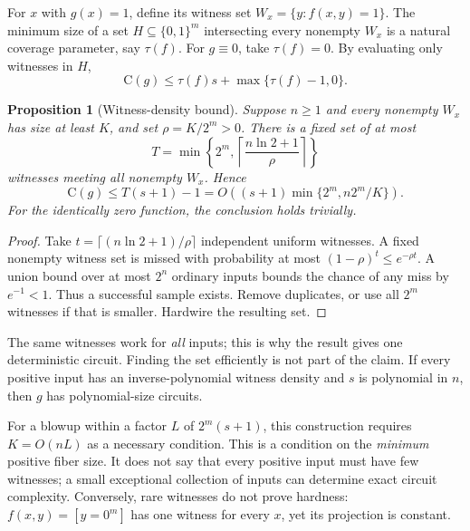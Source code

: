 \documentclass[11pt]{article}
\newtheorem{proposition}[theorem]{Proposition}
\theoremstyle{definition}
\theoremstyle{remark}
\newcommand{\B}{\{0,1\}}
\newcommand{\C}{\mathrm{C}}
\begin{document}
For $x$ with $g(x)=1$, define its witness set
$W_x=\{y:f(x,y)=1\}$. The minimum size of a set
$H\subseteq\B^m$ intersecting every nonempty $W_x$ is a natural
coverage parameter, say $\tau(f)$. For $g\equiv0$, take $\tau(f)=0$.
By evaluating only witnesses in $H$,
\begin{equation}\label{eq:cover}
 \C(g)\le\tau(f)s+\max\{\tau(f)-1,0\}.
\end{equation}

\begin{proposition}[Witness-density bound]\label{prop:density}
Suppose $n\ge1$ and every nonempty $W_x$ has size at least $K$, and set
$\rho=K/2^m>0$. There is a fixed set of at most
\begin{equation}\label{eq:hitting-size}
 T=\min\left\{2^m,
       \left\lceil\frac{n\ln2+1}{\rho}\right\rceil\right\}
\end{equation}
witnesses meeting all nonempty $W_x$. Hence
\begin{equation}\label{eq:density}
 \C(g)\le T(s+1)-1
       =O\!\left((s+1)\min\{2^m,n2^m/K\}\right).
\end{equation}
For the identically zero function, the conclusion holds trivially.
\end{proposition}
\begin{proof}
Take $t=\lceil(n\ln2+1)/\rho\rceil$ independent uniform witnesses.
A fixed nonempty witness set is missed with probability at most
$(1-\rho)^t\le e^{-\rho t}$. A union bound over at most $2^n$
ordinary inputs bounds the chance of any miss by $e^{-1}<1$.
Thus a successful sample exists. Remove duplicates, or use all $2^m$
witnesses if that is smaller. Hardwire the resulting set.
\end{proof}

The same witnesses work for \emph{all} inputs; this is why the result
gives one deterministic circuit. Finding the set efficiently is not
part of the claim. If every positive input has an inverse-polynomial
witness density and $s$ is polynomial in $n$, then $g$ has
polynomial-size circuits.

For a blowup within a factor $L$ of $2^m(s+1)$, this construction
requires $K=O(nL)$ as a necessary condition. This is a condition on
the \emph{minimum} positive fiber size. It does not say that every
positive input must have few witnesses; a small exceptional collection
of inputs can determine exact circuit complexity. Conversely, rare
witnesses do not prove hardness: $f(x,y)=[y=0^m]$ has one witness for
every $x$, yet its projection is constant.
\end{document}
